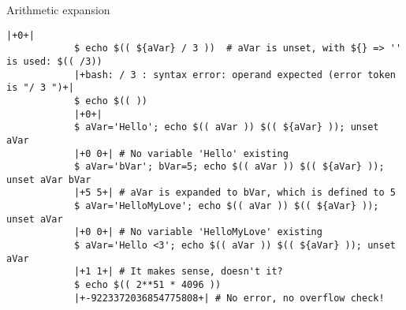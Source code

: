 \begin{frame}[fragile]{Arithmetic expansion}
\begin{onlyenv}
\begin{lstlisting}[style=MyBash, style=oddnumbers, style=smaller]
            |+0+|
            $ echo $(( ${aVar} / 3 ))  # aVar is unset, with ${} => '' is used: $(( /3))
            |+bash: / 3 : syntax error: operand expected (error token is "/ 3 ")+|
            $ echo $(( ))
            |+0+|
            $ aVar='Hello'; echo $(( aVar )) $(( ${aVar} )); unset aVar
            |+0 0+| # No variable 'Hello' existing
            $ aVar='bVar'; bVar=5; echo $(( aVar )) $(( ${aVar} )); unset aVar bVar
            |+5 5+| # aVar is expanded to bVar, which is defined to 5
            $ aVar='HelloMyLove'; echo $(( aVar )) $(( ${aVar} )); unset aVar
            |+0 0+| # No variable 'HelloMyLove' existing
            $ aVar='Hello <3'; echo $(( aVar )) $(( ${aVar} )); unset aVar
            |+1 1+| # It makes sense, doesn't it?
            $ echo $(( 2**51 * 4096 ))
            |+-9223372036854775808+| # No error, no overflow check!
        \end{lstlisting}
    \end{onlyenv}
\end{frame}
